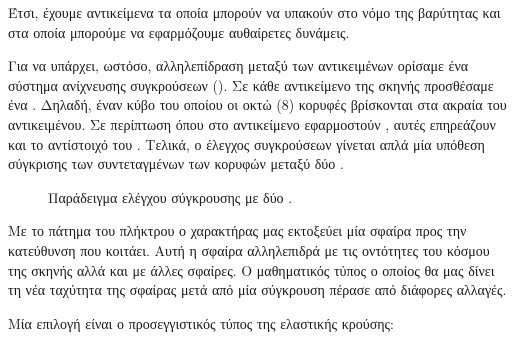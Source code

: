 \documentclass[11pt]{scrartcl} %
\begin{document}
Έτσι, έχουμε αντικείμενα τα οποία μπορούν να υπακούν στο νόμο της βαρύτητας και στα οποία μπορούμε να 
εφαρμόζουμε αυθαίρετες δυνάμεις.

Για να υπάρχει, ωστόσο, αλληλεπίδραση μεταξύ των αντικειμένων ορίσαμε ένα σύστημα ανίχνευσης συγκρούσεων (). 
Σε κάθε αντικείμενο της σκηνής προσθέσαμε ένα . Δηλαδή, έναν κύβο του οποίου 
οι οκτώ (8) κορυφές βρίσκονται στα ακραία  του αντικειμένου. 
Σε περίπτωση όπου στο αντικείμενο εφαρμοστούν , αυτές επηρεάζουν και το αντίστοιχό του .
Τελικά, ο έλεγχος συγκρούσεων γίνεται απλά μία υπόθεση σύγκρισης των συντεταγμένων των κορυφών μεταξύ δύο .

\begin{figure}[H]
    \begin{center}
    \end{center}
    \caption{Παράδειγμα ελέγχου σύγκρουσης με δύο .}
\end{figure}

Με το πάτημα του πλήκτρου  ο χαρακτήρας μας εκτοξεύει μία σφαίρα προς την κατεύθυνση που κοιτάει. Αυτή η σφαίρα
αλληλεπιδρά με τις οντότητες του κόσμου της σκηνής αλλά και με άλλες σφαίρες. Ο μαθηματικός τύπος
ο οποίος θα μας δίνει τη νέα ταχύτητα της σφαίρας μετά από μία σύγκρουση πέρασε από διάφορες αλλαγές. 

Μία επιλογή είναι ο προσεγγιστικός τύπος της ελαστικής κρούσης:
\end{document}
